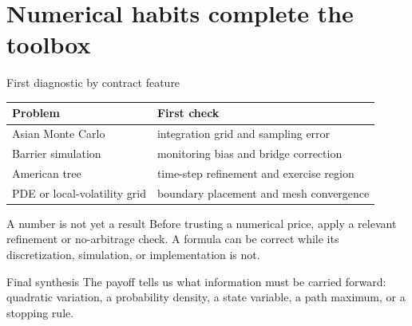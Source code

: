 \documentclass[10pt]{article}
\begin{document}
\section{Numerical habits complete the toolbox}
\begin{keyidea}{First diagnostic by contract feature}
\begin{center}
\begin{tabular}{p{}|p{}}
\toprule
Problem&First check\\\midrule
Asian Monte Carlo&integration grid and sampling error\\
Barrier simulation&monitoring bias and bridge correction\\
American tree&time-step refinement and exercise region\\
PDE or local-volatility grid&boundary placement and mesh convergence\\
\bottomrule
\end{tabular}
\end{center}
\end{keyidea}
\begin{warningbox}{A number is not yet a result}
Before trusting a numerical price, apply a relevant refinement or
no-arbitrage check. A formula can be correct while its discretization,
simulation, or implementation is not.
\end{warningbox}
\begin{keyidea}{Final synthesis}
The payoff tells us what information must be carried forward: quadratic
variation, a probability density, a state variable, a path maximum, or a
stopping rule.
\end{keyidea}
\end{document}
